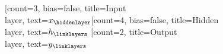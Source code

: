 \begin{neuralnetwork}[height=4]
    \newcommand{\nodetextclear}[2]{}
    \newcommand{\nodetexth}[2]{$h_#2$}
    \newcommand{\nodetextx}[2]{$x_#2$}
    \newcommand{\nodetexty}[2]{$y_#2$}
    [count=3, bias=false, title=Input\\layer, text=\nodetextx]
    \hiddenlayer[count=4, bias=false, title=Hidden\\layer, text=\nodetexth] \linklayers
    \outputlayer[count=2, title=Output\\layer, text=\nodetexty] \linklayers
\end{neuralnetwork}